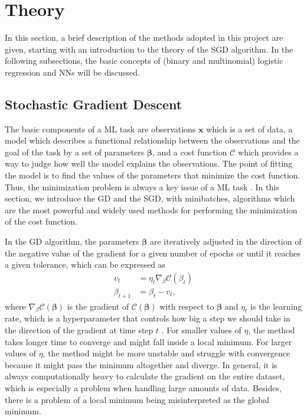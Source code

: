 \documentclass[a4paper]{article}
\begin{document}
\section{Theory}
In this section, a brief description of the methods adopted in this project are given, starting with an introduction to the theory of the SGD algorithm. In the following subsections, the basic concepts of (binary and multinomial) logistic regression and NNs will be discussed.

\subsection{Stochastic Gradient Descent}
The basic components of a ML task are observations $\mathbf{x}$ which is a set of data, a model which describes a functional relationship between the observations and the goal of the task by a set of parameters $\boldsymbol{\beta}$, and a cost function $\mathcal{C}$ which provides a way to judge how well the model explains the observations. The point of fitting the model is to find the values of the parameters that minimize the cost function. Thus, the minimization problem is always a key issue of a ML task \cite{Pankaj}. In this section, we introduce the GD and the SGD, with minibatches, algorithms which are the most powerful and widely used methods for performing the minimization of the cost function.

In the GD algorithm, the parameters $\boldsymbol{\beta}$ are iteratively adjusted in the direction of the negative value of the gradient for a given number of epochs or until it reaches a given tolerance, which can be expressed as
\begin{align}
    v_{t} &= \eta_t \nabla_\beta \mathcal{C}(\beta_t) \nonumber \\
    \beta_{t+1} &= \beta_t - v_{t},
\end{align}
where $\nabla_\beta \mathcal{C}(\boldsymbol{\beta})$ is the gradient of $\mathcal{C}(\boldsymbol{\beta})$ with respect to $\boldsymbol{\beta}$ and $\eta_t$ is the learning rate, which is a hyperparameter that controls how big a step we should take in the direction of the gradient at time step $t$ \cite{Pankaj}. For smaller values of $\eta$, the method takes longer time to converge and might fall inside a local minimum. For larger values of $\eta$, the method might be more unstable and struggle with convergence because it might pass the minimum altogether and diverge. In general, it is always computationally heavy to calculate the gradient on the entire dataset, which is especially a problem when handling large amounts of data. Besides, there is a problem of a local minimum being misinterpreted as the global minimum. 
\end{document}
